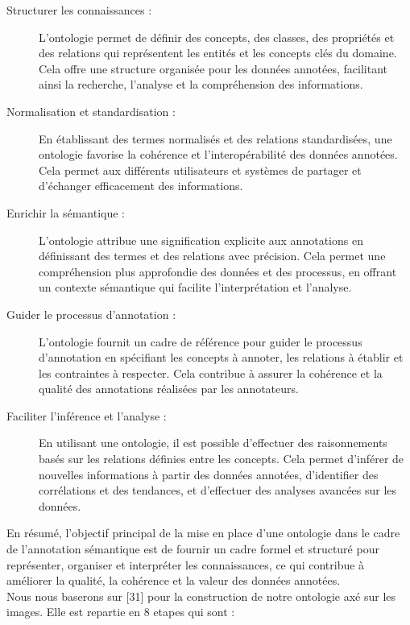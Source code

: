 \documentclass{article}
\begin{document}
	\begin{description}
		\item[Structurer les connaissances : ]L'ontologie permet de définir des concepts, des classes, des propriétés et des relations qui représentent les entités et les concepts clés du domaine. Cela offre une structure organisée pour les données annotées, facilitant ainsi la recherche, l'analyse et la compréhension des informations.
		
		\item[Normalisation et standardisation : ]En établissant des termes normalisés et des relations standardisées, une ontologie favorise la cohérence et l'interopérabilité des données annotées. Cela permet aux différents utilisateurs et systèmes de partager et d'échanger efficacement des informations.
		
		\item[Enrichir la sémantique :] L'ontologie attribue une signification explicite aux annotations en définissant des termes et des relations avec précision. Cela permet une compréhension plus approfondie des données et des processus, en offrant un contexte sémantique qui facilite l'interprétation et l'analyse.
		
		\item[Guider le processus d'annotation : ]L'ontologie fournit un cadre de référence pour guider le processus d'annotation en spécifiant les concepts à annoter, les relations à établir et les contraintes à respecter. Cela contribue à assurer la cohérence et la qualité des annotations réalisées par les annotateurs.
		
		\item[Faciliter l'inférence et l'analyse :]En utilisant une ontologie, il est possible d'effectuer des raisonnements basés sur les relations définies entre les concepts. Cela permet d'inférer de nouvelles informations à partir des données annotées, d'identifier des corrélations et des tendances, et d'effectuer des analyses avancées sur les données.
		
	
	\end{description}
	
		En résumé, l'objectif principal de la mise en place d'une ontologie dans le cadre de l'annotation sémantique est de fournir un cadre formel et structuré pour représenter, organiser et interpréter les connaissances, ce qui contribue à améliorer la qualité, la cohérence et la valeur des données annotées. \\
		
		Nous nous baserons sur [31] pour la construction de notre ontologie axé sur les images. Elle est repartie en 8 etapes qui sont : 
		
\end{document}
